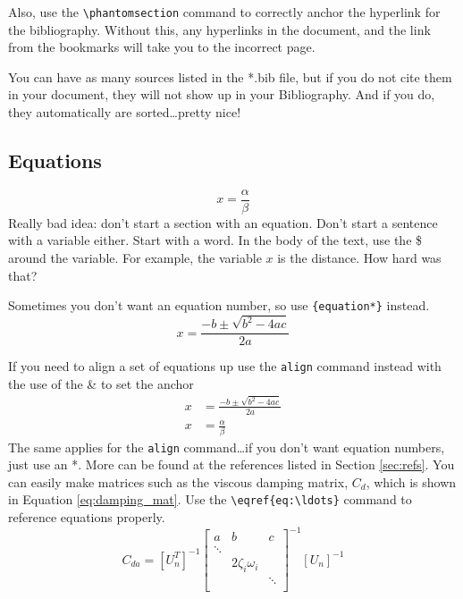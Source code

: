 \documentclass[12pt]{report}
\begin{document}
Also, use the \verb'\phantomsection' command to correctly anchor the hyperlink for the bibliography.  Without this, any hyperlinks in the document, and the link from the bookmarks will take you to the incorrect page.

You can have as many sources listed in the *.bib file, but if you do not cite them in your document, they will not show up in your Bibliography.  And if you do, they automatically are sorted\ldots pretty nice!  

\subsection{Equations}\label{sec:equations}
\begin{equation}\label{eq:alphaoverbeta} %
x=\frac{\alpha}{\beta}
\end{equation}
Really bad idea: don't start a section with an equation. Don't start a sentence with a variable either. Start with a word. In the body of the text, use the \$ around the variable.  For example, the variable $x$ is the distance. How hard was that?

Sometimes you don't want an equation  number, so use \verb'{equation*}' instead.
\begin{equation*}
x=\frac{-b\pm\sqrt{b^2-4ac}}{2a}
\end{equation*}

If you need to align a set of equations up use the \verb'align' command instead with the use of the \& to set the anchor
\begin{align}
x&=\frac{-b\pm\sqrt{b^2-4ac}}{2a}\\
x&=\frac{\alpha}{\beta}
\end{align}
The same applies for the \verb'align' command\ldots if you don\rq{}t want equation numbers,  just use an *.  More can be found at the references listed in Section \ref{sec:refs}.  You can easily make matrices such as the viscous damping matrix, $C_d$, which is shown in Equation \eqref{eq:damping_mat}.  Use the \verb'\eqref{eq:\ldots}' command to reference equations properly.
%
\begin{equation}
\label{eq:damping_mat}
C_{da} =[U_n^T]^{-1}
\left[ \begin{array}{ccc}
a&b&c\\
	\ddots & 				& \\
	     	& 2 \zeta_i \omega_i 		& \\
		&				& \ddots \\
\end{array} \right]^{{-1}} [U_n]^{-1}
\end{equation}
\end{document}
